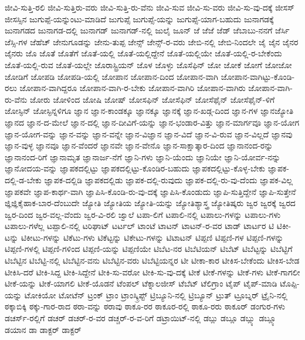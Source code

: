 {ಜೀವಿ-ಸುತ್ತಿ-ರಲಿ
ಜೀವಿ-ಸುತ್ತಿರು-ವರು
ಜೀವಿ-ಸುತ್ತಿ-ರು-ವೆನು
ಜೀವಿ-ಸುವ
ಜೀವಿ-ಸು-ವರು
ಜೀವಿ-ಸು-ವು-ದಕ್ಕೆ
ಜೀಸಸ್
ಜೀಸಸ್ಸಿನ
ಜುಗುಪ್ಪೆ-ಯನ್ನುಂಟು-ಮಾಡಿದೆ
ಜುಗುಪ್ಸೆ
ಜುಗುಪ್ಸೆ-ಯನ್ನು
ಜುಗುಪ್ಸೆ-ಯಾಗ-ಬಹುದು
ಜುನಾಗಡಕ್ಕೆ
ಜುನಾಗಡದ
ಜುನಾಗಡ-ದಲ್ಲಿ
ಜುನಾಗಡ್
ಜುನಾಗಡ್-ನಲ್ಲಿ
ಜುಲೈ
ಜೂನ್
ಜೆ
ಜೆಜೆ
ಜೆಡ್
ಜೆಬಾಬು-ನನಗೆ
ಜೆರ್ಸಿ
ಜೆಸ್ಸಿ-ಗಳ
ಜೆಹೆಚ್
ಜೇನುಗೂಡನ್ನು
ಜೇನು-ತುಪ್ಪ
ಜೇನ್ಸ್
ಜೇನ್ಸ್-ರ-ವರು
ಜೇಬಿ-ನಲ್ಲಿ
ಜೇಬಿ-ನಿಂದಲೇ
ಜೈ
ಜೈನ
ಜೈನರ
ಜೈನರು
ಜೊ
ಜೊತೆ
ಜೊತೆಗೆ
ಜೊತೆ-ಯಲ್ಲಿ
ಜೊತೆ-ಯಲ್ಲಿದ್ದೇನೆ
ಜೊತೆ-ಯಲ್ಲಿಯೇ
ಜೊತೆ-ಯಲ್ಲಿ-ರ-ಬೇಕೆಂದು
ಜೊತೆ-ಯಲ್ಲಿ-ರುವ
ಜೊತೆ-ಯಲ್ಲೇ
ಜೊರಾಸ್ಟ್ರಿಯನ್
ಜೊಳ
ಜೊಳ್ಳು
ಜೊಸೆಫಿನ್
ಜೋ
ಜೋಕೆ
ಜೋಗೆ
ಜೋಜೋ
ಜೋಡಿಗೆ
ಜೋಪಡಿ
ಜೋಪಡಿ-ಯಲ್ಲಿ
ಜೋಪಾನ
ಜೋಪಾನ-ದಿಂದ
ಜೋಪಾನ-ವಾಗಿ
ಜೋಪಾನ-ವಾಗಿಟ್ಟು-ಕೊಂಡಿ-ರಲು
ಜೋಪಾನ-ವಾಗಿದ್ದರೂ
ಜೋಪಾನ-ವಾಗಿ-ರ-ಬೇಕು
ಜೋಪಾನ-ವಾಗಿರಿ
ಜೋಪಾನ-ವಾಗಿರು
ಜೋಪಾನ-ವಾಗಿ-ರು-ವೆನು
ಜೋರು
ಜೋಳಿಂದ
ಜೋಷಿ
ಜೋಷ್
ಜೋಸಫಿನ್
ಜೋಸೆಫಿನ್
ಜೋಸೆಫೈನ್
ಜೋಸೆಫೈನ್-ಳಿಗೆ
ಜೋಸ್ಫಿನ್
ಜೋಸ್ಫಿನ್ನಳಿಗೂ
ಜ್ಞಾನ
ಜ್ಞಾನ-ಕಾಂಡಕ್ಕೂ
ಜ್ಞಾನಕ್ಕೂ
ಜ್ಞಾನಕ್ಕೆ
ಜ್ಞಾನ-ಖಡ್ಗ-ದಿಂದ
ಜ್ಞಾನ-ಗಳ
ಜ್ಞಾನಜ್ಯೋತಿ
ಜ್ಞಾನದ
ಜ್ಞಾನ-ದ-ಮೇಲೆ
ಜ್ಞಾನ-ದಲ್ಲಿ
ಜ್ಞಾನ-ದೀವಿಗೆ-ಯನ್ನು
ಜ್ಞಾನ-ಭಂಡಾರ-ವಿತ್ತು
ಜ್ಞಾನ-ಮಾರ್ಗವೂ
ಜ್ಞಾನ-ಯೋಗ
ಜ್ಞಾನ-ಯೋಗ-ವನ್ನು
ಜ್ಞಾನ-ವನ್ನು
ಜ್ಞಾನ-ವನ್ನೇ
ಜ್ಞಾನ-ವಿಜ್ಞಾನ
ಜ್ಞಾನ-ವಿದೆ
ಜ್ಞಾನ-ವಿ-ರುವ
ಜ್ಞಾನ-ವಿಲ್ಲದೆ
ಜ್ಞಾನವು
ಜ್ಞಾನ-ವುಳ್ಳ
ಜ್ಞಾನವೂ
ಜ್ಞಾನ-ವೆಂದರೆ
ಜ್ಞಾನವೇ
ಜ್ಞಾನ-ವೇನೊ
ಜ್ಞಾನ-ಸಾಕ್ಷಾತ್ಕಾರ-ದಿಂದ
ಜ್ಞಾನಾನಂದ-ರನ್ನು
ಜ್ಞಾನಾನಂದ-ರಿಗೆ
ಜ್ಞಾನಾಮೃತ
ಜ್ಞಾನಾರ್ಜ-ನೆಗೆ
ಜ್ಞಾನಿ-ಗಳು
ಜ್ಞಾನಿ-ಯೆಂದು
ಜ್ಞಾನಿಯೇ
ಜ್ಞಾನಿ-ಯೋರ್ವ-ನನ್ನು
ಜ್ಞಾನೋದಯ-ವನ್ನು
ಜ್ಞಾಪಕದಲ್ಲಿಟ್ಟು
ಜ್ಞಾಪಕದಲ್ಲಿಟ್ಟು-ಕೊಂಡಿರ-ಬಹುದು
ಜ್ಞಾಪಕದಲ್ಲಿಟ್ಟು-ಕೊಳ್ಳ-ಬೇಕು
ಜ್ಞಾಪಕ-ದಲ್ಲಿ-ಡ-ಬೇಕು
ಜ್ಞಾಪಕ-ದಲ್ಲಿಡಿ
ಜ್ಞಾಪಕದಲ್ಲಿಡು
ಜ್ಞಾಪಕ-ದಲ್ಲಿ-ರುವುದು
ಜ್ಞಾಪಕ-ದಲ್ಲಿ-ರು-ವು-ದೆಂದು
ಜ್ಞಾಪಕ-ವಿಲ್ಲ
ಜ್ಞಾಪಕವೇ
ಜ್ಞಾಪ-ಕಾರ್ಥ-ವಾಗಿ
ಜ್ಞಾಪಿಸಿ-ಕೊಂಡಿ-ರು-ವು-ದಕ್ಕೆ
ಜ್ಞಾಪಿಸಿ-ಕೊಂಡುದು
ಜ್ಞಾಪಿ-ಸುತ್ತಿದ್ದೇನೆ
ಜ್ಞಾಪಿ-ಸುತ್ತೇನೆ
ಜ್ಞಿಜ್ಞಿಕೈಹಾಕ-ಬಾರ-ದೆಂಬುದೇ
ಜ್ಯೋತಿ
ಜ್ಯೋತಿಯ
ಜ್ಯೋತಿ-ಯನ್ನು
ಜ್ಯೋತಿಶ್ಯಾಸ್ತ್ರ
ಜ್ಯೋತಿಷ್ಕರು
ಜ್ವರ
ಜ್ವರಕ್ಕೆ
ಜ್ವರದ
ಜ್ವರ-ದಿಂದ
ಜ್ವರ-ವಲ್ಲ-ವೆಂದು
ಜ್ವರ-ವಿ-ರಲಿ
ಜ್ವಾಲೆ
ಟಪಾ-ಲಿಗೆ
ಟಪಾಲಿ-ನಲ್ಲಿ
ಟಪಾಲು-ಗಳನ್ನು
ಟಪಾಲು-ಗಳು
ಟಪಾಲು-ಗಳೆಲ್ಲ
ಟಪ್ಪಾಲಿ-ನಲ್ಲಿ
ಟರಿಘಾಟ್
ಟರ್ಟಲ್
ಟಾಂಟೆ
ಟಾಟನ್
ಟಾಟನ್-ರ-ವರ
ಟಾಡ್
ಟಾರ್ಟರ
ಟಿ
ಟಿಕೀ-ಟನ್ನು
ಟಿಕೀಟು-ಗಳನ್ನು
ಟಿಕೆಟು-ಗಳು
ಟಿಕೆಟ್ಟನ್ನು
ಟಿಕೇಟು-ಗಳನ್ನು
ಟಿಟಾಟನ್
ಟಿಪ್ಪಣಿ
ಟಿಪ್ಪಣಿ-ಗಳ
ಟಿಪ್ಪಣಿ-ಗಳನ್ನು
ಟಿಪ್ಪಣಿ-ಗಳಲ್ಲಿ
ಟಿಪ್ಪಣಿ-ಗಳಿಂದ
ಟಿಪ್ಪಣಿ-ಯನ್ನು
ಟಿಪ್ಪಣಿಯೇ
ಟಿಬೆಟ-ನರ
ಟಿಬೆಟಿಯನ್
ಟಿಬೆಟ್
ಟಿಬೆಟ್ಟನ್ನು
ಟಿಬೆಟ್ಟಿಗೆ
ಟಿಬೆಟ್ಟಿನ
ಟಿಬೆಟ್ಟಿ-ನಲ್ಲಿ
ಟಿಬೆಟ್ಟಿನ-ವನು
ಟಿಬೆಟ್ಟಿನ-ವರು
ಟಿಬೆಟ್ಟಿಯನ್ನರ
ಟೀ
ಟೀಕಾ-ಕಾರ
ಟೀಕಿಸ-ಬೇಕೆಂದು
ಟೀಕಿಸ-ಬೇಡ
ಟೀಕಿಸಿ-ದರೆ
ಟೀಕಿ-ಸಿದ್ದ
ಟೀಕಿ-ಸಿದ್ದೇನೆ
ಟೀಕಿ-ಸು-ವರೋ
ಟೀಕಿ-ಸು-ವು-ದಕ್ಕೆ
ಟೀಕೆ
ಟೀಕೆ-ಗಳನ್ನು
ಟೀಕೆ-ಗಳು
ಟೀಕೆ-ಗಾಗಲೀ
ಟೀಕೆ-ಯನ್ನು
ಟೀಕೆ-ಯಾಗಲಿ
ಟೀಕೆ-ಯೊಡನೆ
ಟೆಂಪಲ್
ಟೆಕ್ನಾಲಜೀಸ್
ಟೆಬೆಟ್
ಟೆಲಿಗ್ರಾಂ
ಟೈಪ್
ಟೈಪ್-ಮಾಡಿ
ಟೊಪ್ಪಿ-ಯನ್ನು
ಟೋಕಿಯೋ
ಟೋಟೆನ್
ಟ್ರಂಕ್
ಟ್ರಾಂ
ಟ್ರಾಂಸ್ಕ್ರಿಪ್ಟ್
ಟ್ರಿಬ್ಯೂನಿ-ನಲ್ಲಿ
ಟ್ರಿಬ್ಯೂನ್
ಟ್ರುತ್
ಟ್ರೂಬ್ನರ್
ಟ್ರೈನಿ-ನಲ್ಲಿ
ಠಕ್ಕಾಬಿಕ್ಕಿ
ಠಕ್ಕು-ಗಾರ-ರಾದ
ಠರಾ-ವನ್ನು
ಠರಾವು
ಠಾಕೂ-ರರ
ಠಾಕೂರ-ರಲ್ಲಿ
ಠಾಕೂ-ರರು
ಠಾಕೂರ್
ಡಂಗುರ-ಗಳು
ಡಚರ್ಸ್-ರಲ್ಲಿಗೆ
ಡಚರ್
ಡಚರ್-ರ-ವರ
ಡಚ್ಚರ್-ರ-ವ-ರಿಗೆ
ಡಟ್ರಾಯಿಟ್-ನಲ್ಲಿ
ಡಬ್ಲು
ಡಬ್ಲೂ
ಡಬ್ಲ್ಯು
ಡಬ್ಲ್ಯೂ
ಡಯಾನ
ಡಾ
ಡಾಕ್ಟರ್
ಡಾಕ್ಟರ್
}
